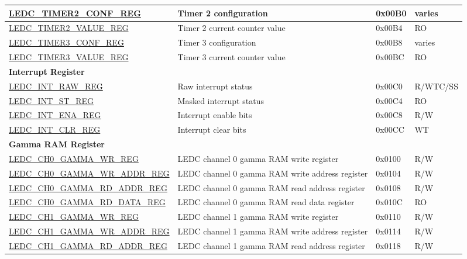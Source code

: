 \begin{longtable}{ | m{6cm} | p{6.7cm} | p{1.3cm} | p{1.5cm} | }
\hyperref[regdesc:LEDCTIMERXCONFREG]{LEDC\_TIMER2\_CONF\_REG} & Timer 2 configuration & 0x00B0 & varies \\ \hline
\hyperref[regdesc:LEDCTIMERXVALUEREG]{LEDC\_TIMER2\_VALUE\_REG} & Timer 2 current counter value & 0x00B4 & RO \\ \hline
\hyperref[regdesc:LEDCTIMERXCONFREG]{LEDC\_TIMER3\_CONF\_REG} & Timer 3 configuration & 0x00B8 & varies \\ \hline
\hyperref[regdesc:LEDCTIMERXVALUEREG]{LEDC\_TIMER3\_VALUE\_REG} & Timer 3 current counter value & 0x00BC & RO \\ \hline
\multicolumn{4}{|l|}{\textbf{Interrupt Register}} \\ \hline
\hyperref[regdesc:LEDCINTRAWREG]{LEDC\_INT\_RAW\_REG} & Raw interrupt status & 0x00C0 & R/WTC/SS \\ \hline
\hyperref[regdesc:LEDCINTSTREG]{LEDC\_INT\_ST\_REG} & Masked interrupt status & 0x00C4 & RO \\ \hline
\hyperref[regdesc:LEDCINTENAREG]{LEDC\_INT\_ENA\_REG} & Interrupt enable bits & 0x00C8 & R/W \\ \hline
\hyperref[regdesc:LEDCINTCLRREG]{LEDC\_INT\_CLR\_REG} & Interrupt clear bits & 0x00CC & WT \\ \hline
\multicolumn{4}{|l|}{\textbf{Gamma RAM Register}} \\ \hline
\hyperref[regdesc:LEDCCHNGAMMAWRREG]{LEDC\_CH0\_GAMMA\_WR\_REG} & LEDC channel 0 gamma RAM write register & 0x0100 & R/W \\ \hline
\hyperref[regdesc:LEDCCHNGAMMAWRADDRREG]{LEDC\_CH0\_GAMMA\_WR\_ADDR\_REG} & LEDC channel 0 gamma RAM write address register & 0x0104 & R/W \\ \hline
\hyperref[regdesc:LEDCCHNGAMMARDADDRREG]{LEDC\_CH0\_GAMMA\_RD\_ADDR\_REG} & LEDC channel 0 gamma RAM read address register & 0x0108 & R/W \\ \hline
\hyperref[regdesc:LEDCCHNGAMMARDDATAREG]{LEDC\_CH0\_GAMMA\_RD\_DATA\_REG} & LEDC channel 0 gamma RAM read data register & 0x010C & RO \\ \hline
\hyperref[regdesc:LEDCCHNGAMMAWRREG]{LEDC\_CH1\_GAMMA\_WR\_REG} & LEDC channel 1 gamma RAM write register & 0x0110 & R/W \\ \hline
\hyperref[regdesc:LEDCCHNGAMMAWRADDRREG]{LEDC\_CH1\_GAMMA\_WR\_ADDR\_REG} & LEDC channel 1 gamma RAM write address register & 0x0114 & R/W \\ \hline
\hyperref[regdesc:LEDCCHNGAMMARDADDRREG]{LEDC\_CH1\_GAMMA\_RD\_ADDR\_REG} & LEDC channel 1 gamma RAM read address register & 0x0118 & R/W \\ \hline

\end{longtable}
